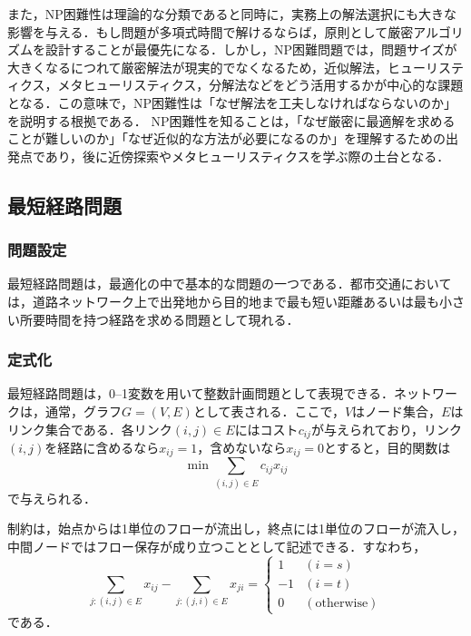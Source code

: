また，NP困難性は理論的な分類であると同時に，実務上の解法選択にも大きな影響を与える．もし問題が多項式時間で解けるならば，原則として厳密アルゴリズムを設計することが最優先になる．しかし，NP困難問題では，問題サイズが大きくなるにつれて厳密解法が現実的でなくなるため，近似解法，ヒューリスティクス，メタヒューリスティクス，分解法などをどう活用するかが中心的な課題となる．この意味で，NP困難性は「なぜ解法を工夫しなければならないのか」を説明する根拠である．
NP困難性を知ることは，「なぜ厳密に最適解を求めることが難しいのか」「なぜ近似的な方法が必要になるのか」を理解するための出発点であり，後に近傍探索やメタヒューリスティクスを学ぶ際の土台となる．



\subsection{最短経路問題}

\subsubsection{問題設定}

最短経路問題は，最適化の中で基本的な問題の一つである．都市交通においては，道路ネットワーク上で出発地から目的地まで最も短い距離あるいは最も小さい所要時間を持つ経路を求める問題として現れる．

\subsubsection{定式化}

最短経路問題は，0--1変数を用いて整数計画問題として表現できる．ネットワークは，通常，グラフ$G=(V,E)$として表される．ここで，$V$はノード集合，$E$はリンク集合である．各リンク$(i,j)\in E$にはコスト$c_{ij}$が与えられており，リンク$(i,j)$を経路に含めるなら$x_{ij}=1$，含めないなら$x_{ij}=0$とすると，目的関数は
\begin{equation}
\min \sum_{(i,j)\in E}c_{ij}x_{ij}
\end{equation}
で与えられる．

制約は，始点からは1単位のフローが流出し，終点には1単位のフローが流入し，中間ノードではフロー保存が成り立つこととして記述できる．すなわち，
\begin{equation}
\sum_{j:(i,j)\in E}x_{ij}-\sum_{j:(j,i)\in E}x_{ji}=
\begin{cases}
1&(i=s)\\
-1&(i=t)\\
0&(\text{otherwise})
\end{cases}
\end{equation}
である．

